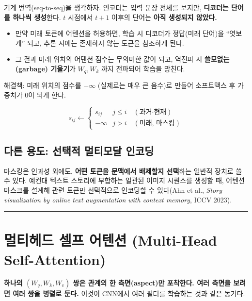\documentclass[
  korean,
]{article}
\providecommand{\tightlist}{%
  \setlength{\itemsep}{0pt}\setlength{\parskip}{0pt}}
\begin{document}
기계 번역(seq-to-seq)을 생각하자. 인코더는 입력 문장 전체를 보지만,
\textbf{디코더는 단어를 하나씩 생성}한다. \(t\) 시점에서 \(t+1\) 이후의
단어는 \textbf{아직 생성되지 않았다.}

\begin{itemize}
\tightlist
\item
  만약 미래 토큰에 어텐션을 허용하면, 학습 시 디코더가 정답(미래 단어)을
  ``엿보게'' 되고, 추론 시에는 존재하지 않는 토큰을 참조하게 된다.
\item
  그 결과 미래 위치의 어텐션 점수는 무의미한 값이 되고, 역전파 시
  \textbf{쓸모없는(garbage) 기울기}가 \(W_q, W_k\) 까지 전파되어 학습을
  망친다.
\end{itemize}

해결책: 미래 위치의 점수를 \(-\infty\) (실제로는 매우 큰 음수)로 만들어
소프트맥스 후 가중치가 0이 되게 한다.

\[
s_{ij} \leftarrow
\begin{cases}
s_{ij} & j \le i \quad(\text{과거·현재})\\[4pt]
-\infty & j > i \quad(\text{미래, 마스킹})
\end{cases}
\]

\subsection{다른 용도: 선택적 멀티모달
인코딩}\label{uxb2e4uxb978-uxc6a9uxb3c4-uxc120uxd0dduxc801-uxba40uxd2f0uxbaa8uxb2ec-uxc778uxcf54uxb529}

마스킹은 인과성 외에도, \textbf{어떤 토큰을 문맥에서 배제할지 선택}하는
일반적 장치로 쓸 수 있다. 예컨대 텍스트 스토리에 부합하는 일관된 이미지
시퀀스를 생성할 때, 어텐션 마스크를 설계해 관련 토큰만 선택적으로
인코딩할 수 있다(Ahn et al., \emph{Story visualization by online text
augmentation with context memory}, ICCV 2023).

\begin{center}\rule{0.5\linewidth}{0.5pt}\end{center}

\section{멀티헤드 셀프 어텐션 (Multi-Head
Self-Attention)}\label{sec-mha}

\begin{tcolorbox}[enhanced jigsaw, arc=.35mm, bottomrule=.15mm, bottomtitle=1mm, breakable, colback=white, colbacktitle=quarto-callout-tip-color!10!white, colframe=quarto-callout-tip-color-frame, coltitle=black, left=2mm, leftrule=.75mm, opacityback=0, opacitybacktitle=0.6, rightrule=.15mm, title=\textcolor{quarto-callout-tip-color}{\faLightbulb}\hspace{0.5em}{핵심 한 줄}, titlerule=0mm, toprule=.15mm, toptitle=1mm]

\textbf{하나의 \((W_q, W_k, W_v)\) 쌍은 관계의 한 측면(aspect)만
포착한다. 여러 측면을 보려면 여러 쌍을 병렬로 둔다.} 이것이 CNN에서 여러
필터를 학습하는 것과 같은 동기다.

\end{tcolorbox}
\end{document}
